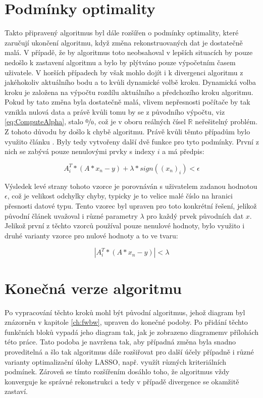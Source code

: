 \documentclass[FM,BP]{tulthesis}
\newcounter{Vzorce}
\begin{document}
\section{Podmínky optimality}
Takto připravený algoritmus byl dále rozšířen o podmínky optimality, které zaručují ukončení algoritmu, když změna rekonstruovaných dat je dostatečně malá. V případě, že by algoritmus toto neobsahoval v lepších situacích by pouze nedošlo k zastavení algoritmu a bylo by plýtváno pouze výpočetním časem uživatele. V horších případech by však mohlo dojít i k divergenci algoritmu z jakéhokoliv aktuálního bodu a to kvůli dynamické volbě kroku. Dynamická volba kroku je založena na výpočtu rozdílu aktuálního a předchozího kroku algoritmu. Pokud by tato změna byla dostatečně malá, vlivem nepřesnosti počítače by tak vznikla nulová data a právě kvůli tomu by se z původního výpočtu, viz \ref{eq:ComputeAlpha}, stalo $\nicefrac{0}{0}$, což je v oboru reálných čísel $\mathbb{R}$ neřešitelný problém. Z tohoto důvodu by došlo k chybě algoritmu. Právě kvůli těmto případům bylo využito článku \cite{homotopy}. Byly tedy vytvořeny další dvě funkce pro tyto podmínky. První z nich se zabývá pouze nenulovými prvky s indexy $i$ a má předpis:

\begin{equation} \label{eq:homotopy1}  \tag{Vzorec \theVzorce}
A_{i}^{T}*(A*x_{n} - y) + \lambda * sign((x_{n})_{i}) < \epsilon
\end{equation}

Výsledek levé strany tohoto vzorce je porovnáván s uživatelem zadanou hodnotou $\epsilon$, což je velikost odchylky chyby, typicky je to velice malé číslo na hranici přesnosti datové typu. Tento vzorec byl upraven pro toto konkrétní řešení, jelikož původní článek uvažoval i různé parametry $\lambda$ pro každý prvek původních dat $x$. Jelikož první z těchto vzorců používal pouze nenulové hodnoty, bylo využito i druhé varianty vzorce pro nulové hodnoty a to ve tvaru:

\begin{equation} \label{eq:homotopy2}  \tag{Vzorec \theVzorce}
\left|A_{i}^{T}*(A*x_{n} - y)\right| < \lambda
\end{equation}

\section{Konečná verze algoritmu}
Po vypracování těchto kroků mohl být původní algoritmus, jehož diagram byl znázorněn v kapitole \ref{ch:fwbw}, upraven do konečné podoby. Po přidání těchto funkčních bloků vypadá jeho diagram tak, jak je zobrazeno diagramemv přílohách této práce. Tato podoba je navržena tak, aby případná změna byla snadno proveditelná a šlo tak algoritmus dále rozšiřovat pro další účely případně i různé varianty optimalizační úlohy LASSO, např. využít různých kriteriálních podmínek. Zároveň se tímto rozšířením dosáhlo toho, že algoritmus vždy konverguje ke správné rekonstrukci a tedy v případě divergence se okamžitě zastaví. 
\end{document}
